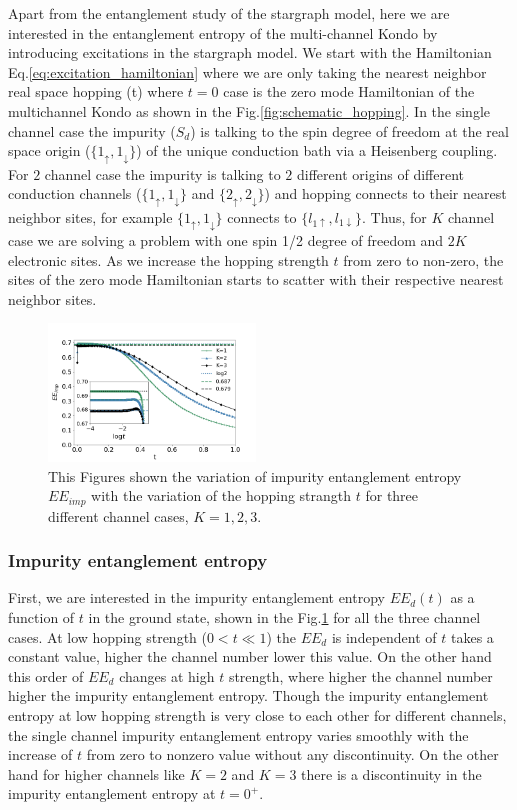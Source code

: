 \documentclass[reprint,prb,superscriptaddress]{revtex4-1}
\begin{document}
\noindent Apart from the entanglement study of the stargraph model, here we are interested in the entanglement entropy of the multi-channel Kondo by introducing excitations in the stargraph model. We start with the Hamiltonian Eq.\eqref{eq:excitation_hamiltonian} where we are only taking the nearest neighbor real space hopping (t) where $t=0$ case is the zero mode Hamiltonian of the multichannel Kondo as shown in the Fig.\ref{fig:schematic_hopping}. In the single channel case the impurity ($S_d$) is talking to the spin degree of freedom at the real space origin ($\{1_{\uparrow},1_{\downarrow}\}$) of the unique conduction bath via a Heisenberg coupling. For $2$ channel case the impurity is talking to $2$ different origins of different conduction channels ($\{1_{\uparrow},1_{\downarrow}\}$ and $\{2_{\uparrow},2_{\downarrow}\}$) and hopping connects to their nearest neighbor sites, for example $\{1_{\uparrow},1_{\downarrow}\}$ connects to $\{l_{1\uparrow},l_{1\downarrow}\}$. Thus, for $K$ channel case we are solving a problem with one spin 1/2 degree of freedom and $2K$ electronic sites. As we increase the hopping strength $t$ from zero to non-zero, the sites of the zero mode Hamiltonian starts to scatter with their respective nearest neighbor sites.
\begin{figure}[!htpb]
\centering
\includegraphics[width=0.49\textwidth]{plt/A_I1_ch123_['d']}
\caption{This Figures shown the variation of impurity entanglement entropy $EE_{imp}$ with the variation of the hopping strangth $t$ for three different channel cases, $K=1,2,3$. }
\label{fig:EE_imp_vs_t_K}
\end{figure}

\subsubsection{Impurity entanglement entropy}
\noindent  First, we are interested in the impurity entanglement entropy $EE_d(t)$  as a function of $t$ in the ground state, shown in the Fig.\ref{fig:EE_imp_vs_t_K} for all the three channel cases. At low hopping strength ($0<t\ll 1$) the $EE_{d}$ is independent of $t$ takes a constant value, higher the channel number lower this value. On the other hand this order of $EE_{d}$ changes at high $t$ strength, where higher the channel number higher the impurity entanglement entropy. Though the impurity entanglement entropy at low hopping strength is very close to each other for different channels, the single channel impurity entanglement entropy varies smoothly with the increase of $t$ from zero to nonzero value without any discontinuity. On the other hand for higher channels like $K=2$ and $K=3$ there is a discontinuity in the impurity entanglement entropy at $t=0^+$.
\end{document}
